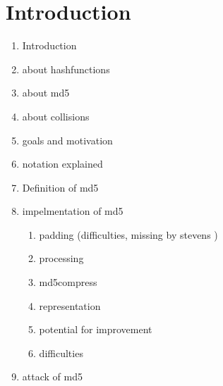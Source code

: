 \chapter{Introduction}
\begin{enumerate}
    \item Introduction
    \item about hashfunctions
    \item about md5
    \item about collisions
    \item goals and motivation
    \item notation explained
    \item Definition of md5
    \item impelmentation of md5
        \begin{enumerate}
            \item padding (difficulties, missing by stevens )
            \item processing
            \item md5compress
            \item representation
            \item potential for improvement 
            \item difficulties
        \end{enumerate}
    \item attack of md5
\end{enumerate}
